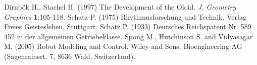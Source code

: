 \documentclass[10pt]{enoc2011}
\begin{document}
\begin{thebibliography}{99}
 Dirnb\"ok H., Stachel H. (1997) The Development of the Oloid.  {\em J. Geometry Graphics}
{\bf 1}:105-118.
 Schatz P. (1975) Rhythmusforschung und Technik. Verlag Freies Geistesleben, Stuttgart.
 Schatz P. (1933) Deutsches Reichspatent Nr. 589 452 in der allgemeinen Getriebeklasse.
 Spong M., Hutchinson S. and Vidyasagar M. (2005) Robot Modeling and Control. Wiley and Sons.
 Bioengineering AG (Sagenrainsrt. 7, 8636 Wald, Switzerland).
\end{thebibliography}
\end{document}

